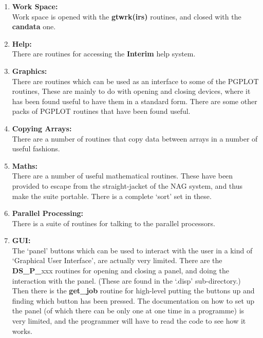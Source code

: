 \begin{enumerate}
\item {\bf Work Space: \\ }
      Work space is opened with the {\bf gtwrk(irs)} routines, and closed
      with the {\bf candata} one.

\item {\bf Help: \\ }
       There are routines for accessing the {\bf Interim} help system.

\item {\bf Graphics: \\ }
      There are routines which can be used
      as an interface to some of the PGPLOT routines, These are mainly to
      do with opening and closing devices, where it has been found
      useful to have them in a standard form. There are some other packs of
      PGPLOT routines that have been found useful. 
           
\item {\bf Copying Arrays: \\}
      There are a number of routines
      that copy data between arrays in a number of useful fashions.

\item {\bf Maths: \\}
      There are a number of useful mathematical routines. These have been
      provided to escape from the straight-jacket of the NAG system, and 
      thus make the suite portable. There is a complete `sort' set in 
      these.

\item {\bf Parallel Processing: \\}
      There is a suite of routines for talking to the parallel processors.

\item {\bf GUI: \\ } 
      The `panel' buttons which can be used to interact with the user
      in a kind of `Graphical User Interface', are actually very limited.
      There are the {\bf DS\_P\_}xxx routines for opening and closing
      a panel, and doing the interaction with the panel. (These are found 
      in the `.disp' sub-directory.) Then there is the {\bf get\_job} routine 
      for high-level putting the buttons up and finding which button has 
      been pressed. The documentation on how to set up the panel (of which
      there can be only one at one time in a programme) is very limited,
      and the programmer will have to read the code to see how it works.

\end{enumerate}


